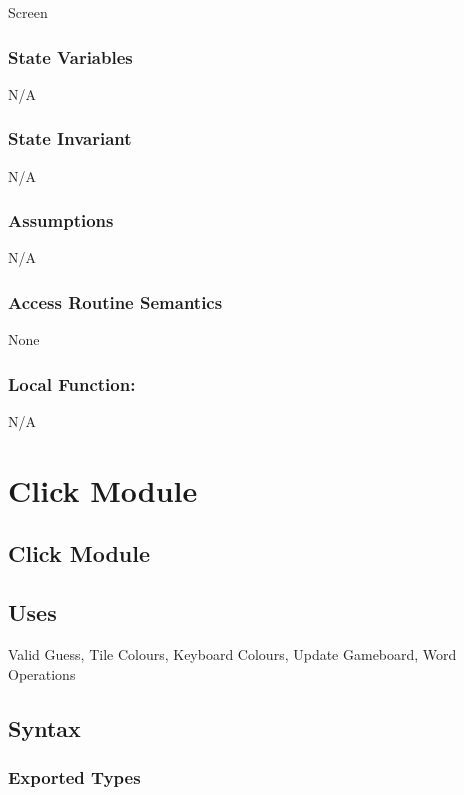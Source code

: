 \documentclass[12pt]{article}
\begin{document}
Screen

\subsubsection* {State Variables}
N/A

\subsubsection* {State Invariant}

N/A

\subsubsection* {Assumptions}

N/A

\subsubsection* {Access Routine Semantics}

None

\subsubsection*{Local Function:}

N/A


\newpage

\section {Click Module}

\subsection* {Click Module}

\subsection* {Uses}

Valid Guess, Tile Colours, Keyboard Colours, Update Gameboard, Word Operations

\subsection* {Syntax}

\subsubsection* {Exported Types}
\end{document}
